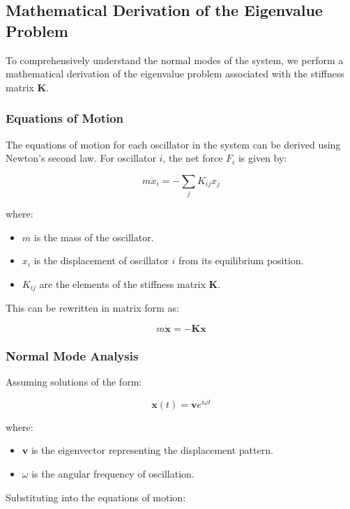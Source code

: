 \documentclass[12pt]{report} %
\begin{document}
\subsection{Mathematical Derivation of the Eigenvalue Problem}
\label{subsec:part2_task2_derivation}

To comprehensively understand the normal modes of the system, we perform a mathematical derivation of the eigenvalue problem associated with the stiffness matrix \( \mathbf{K} \).

\subsubsection{Equations of Motion}
\label{subsubsec:part2_task2_eom}

The equations of motion for each oscillator in the system can be derived using Newton's second law. For oscillator \( i \), the net force \( F_i \) is given by:

\[
m \ddot{x}_i = -\sum_{j} K_{ij} x_j
\]

where:
\begin{itemize}
    \item \( m \) is the mass of the oscillator.
    \item \( x_i \) is the displacement of oscillator \( i \) from its equilibrium position.
    \item \( K_{ij} \) are the elements of the stiffness matrix \( \mathbf{K} \).
\end{itemize}

This can be rewritten in matrix form as:

\[
m \ddot{\mathbf{x}} = -\mathbf{K} \mathbf{x}
\]

\subsubsection{Normal Mode Analysis}
\label{subsubsec:part2_task2_normal_mode}

Assuming solutions of the form:

\[
\mathbf{x}(t) = \mathbf{v} e^{i \omega t}
\]

where:
\begin{itemize}
    \item \( \mathbf{v} \) is the eigenvector representing the displacement pattern.
    \item \( \omega \) is the angular frequency of oscillation.
\end{itemize}

Substituting into the equations of motion:
\end{document}
